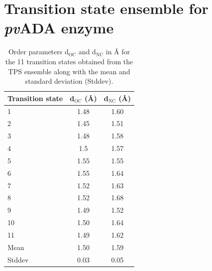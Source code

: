 \documentclass[journal=jpcbfk,manuscript=suppinfo,layout=traditional]{achemso}
\begin{document}
\section{Transition state ensemble for \textit{pv}ADA enzyme}
\begin{table}[ht!]
\caption{Order parameters d$_{\text{OC}}$ and d$_{\text{NC}}$ in {\AA} for the 11 transition states obtained from 
the TPS ensemble along with the mean and standard deviation (Stddev).}
\centering
\begin{tabular}{l c c}
\hline\hline
Transition state & d$_{\text{OC}}$ ({\AA})& d$_{\text{NC}}$ ({\AA})\\
\hline
1& 1.48  &1.60 \\
2& 1.45  &1.51 \\
3& 1.48  &1.58 \\
4& 1.5   &1.57 \\
5& 1.55  &1.55 \\
6& 1.55  &1.64 \\
7& 1.52  &1.63 \\
8& 1.52  &1.68 \\
9& 1.49  &1.52 \\
10&1.50  &1.64 \\
11&1.49  &1.62 \\
\hline
Mean & 1.50 & 1.59 \\
Stddev & 0.03 & 0.05 \\
\hline\hline
\end{tabular}
%
\end{table}



\end{document}
